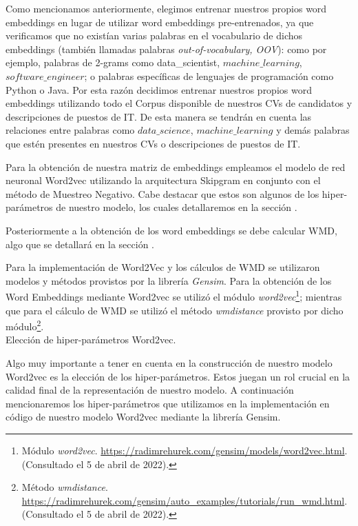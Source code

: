 \documentclass[12pt,a4paper]{article}
\makeatletter
\renewcommand\paragraph{\@startsection{paragraph}{4}{\z@}
            {-2.5ex\@plus -1ex \@minus -.25ex}
            {1.25ex \@plus .25ex}
            {\normalfont\normalsize\bfseries}}
\makeatother
\begin{document}
\begin{sloppypar}
Como mencionamos anteriormente, elegimos entrenar nuestros propios word embeddings en lugar de utilizar word embeddings pre-entrenados, ya que verificamos que no existían varias palabras en el vocabulario de dichos embeddings (también llamadas palabras \textit{out-of-vocabulary, OOV}): como por ejemplo, palabras de 2-grams como data\_scientist, $machine\_learning$, $software\_engineer$; o palabras específicas de lenguajes de programación como Python o Java. Por esta razón decidimos entrenar nuestros propios word embeddings utilizando todo el Corpus disponible de nuestros CVs de candidatos y descripciones de puestos de IT. De esta manera se tendrán en cuenta las relaciones entre palabras como $data\_science$, $machine\_learning$ y demás palabras que estén presentes en nuestros CVs o descripciones de puestos de IT.

Para la obtención de nuestra matriz de embeddings empleamos el modelo de red neuronal Word2vec utilizando la arquitectura Skipgram en conjunto con el método de Muestreo Negativo. Cabe destacar que estos son algunos de los hiper-parámetros de nuestro modelo, los cuales detallaremos en la sección \textit{}.

Posteriormente a la obtención de los word embeddings se debe calcular WMD, algo que se detallará en la sección \textit{}.

Para la implementación de Word2Vec y los cálculos de WMD se utilizaron modelos y métodos provistos por la librería \textit{Gensim}. Para la obtención de los Word Embeddings mediante Word2vec se utilizó el módulo \textit{word2vec}\footnote{Módulo \textit{word2vec}. \url{https://radimrehurek.com/gensim/models/word2vec.html}. (Consultado el 5 de abril de 2022).}; mientras que para el cálculo de WMD se utilizó el método \textit{wmdistance} provisto por dicho módulo\footnote{Método \textit{wmdistance}. \url{https://radimrehurek.com/gensim/auto_examples/tutorials/run_wmd.html}. (Consultado el 5 de abril de 2022).}.
\\

\paragraph{Elección de hiper-parámetros Word2vec.}\label{hiper_par_word2vec}

Algo muy importante a tener en cuenta en la construcción de nuestro modelo Word2vec es la elección de los hiper-parámetros\cite{NLP_26}. Estos juegan un rol crucial en la calidad final de la representación de nuestro modelo. A continuación mencionaremos los hiper-parámetros que utilizamos en la implementación en código de nuestro modelo Word2vec mediante la librería Gensim.


\end{sloppypar}
\end{document}
